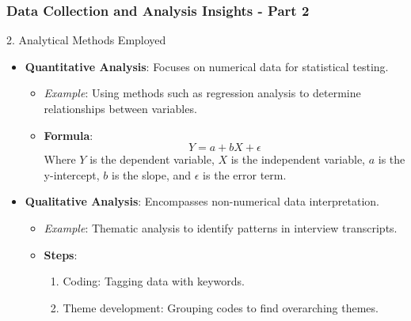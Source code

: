 \documentclass{beamer}
\begin{document}
\begin{frame}[fragile]
    \frametitle{Data Collection and Analysis Insights - Part 2}
    \begin{block}{2. Analytical Methods Employed}
        \begin{itemize}
            \item \textbf{Quantitative Analysis}: Focuses on numerical data for statistical testing.
            \begin{itemize}
                \item \textit{Example}: Using methods such as regression analysis to determine relationships between variables.
                \item \textbf{Formula}:
                \begin{equation}
                    Y = a + bX + \epsilon
                \end{equation}
                Where \(Y\) is the dependent variable, \(X\) is the independent variable, \(a\) is the y-intercept, \(b\) is the slope, and \(\epsilon\) is the error term.
            \end{itemize}
            \item \textbf{Qualitative Analysis}: Encompasses non-numerical data interpretation.
            \begin{itemize}
                \item \textit{Example}: Thematic analysis to identify patterns in interview transcripts.
                \item \textbf{Steps}:
                \begin{enumerate}
                    \item Coding: Tagging data with keywords.
                    \item Theme development: Grouping codes to find overarching themes.
                \end{enumerate}
            \end{itemize}
        \end{itemize}
    \end{block}
\end{frame}
\end{document}

